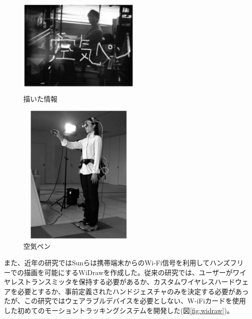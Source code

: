 \documentclass[11pt,a4j, titlepage]{jarticle} %
\begin{document}
\begin{figure}[H]
  \begin{center}
    \includegraphics[clip,height=5.0cm,width=6.0cm]{./tegakijouhou.eps}
    \caption{描いた情報}
    \label{fig:tegakijouhou}
  \end{center}
\end{figure}

\begin{figure}[H]
  \begin{center}
    \includegraphics[clip,height=7.0cm,width=6.0cm]{./kuukipen.eps}
    \caption{空気ペン}
    \label{fig:kuukipen}
  \end{center}
\end{figure}

また、近年の研究ではSunら\cite{sun}は携帯端末からのWi-Fi信号を利用してハンズフリーでの描画を可能にするWiDrawを作成した。従来の研究では、ユーザーがワイヤレストランスミッタを保持する必要があるか、カスタムワイヤレスハードウェアを必要とするか、事前定義されたハンドジェスチャのみを決定する必要があったが、この研究ではウェアラブルデバイスを必要としない、W-iFiカードを使用した初めてのモーショントラッキングシステムを開発した(図\ref{fig:widraw})。
\end{document}
